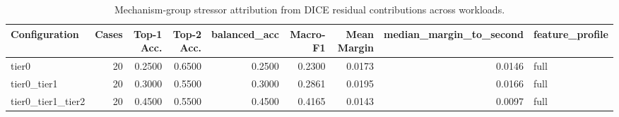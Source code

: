 \begin{table}[t]
\centering
\caption{Mechanism-group stressor attribution from DICE residual contributions across workloads.}
\label{tab:dice_stressor_diagnosis}
\footnotesize
\begin{tabular}{lrrrrrrrl}
\toprule
Configuration & Cases & Top-1 Acc. & Top-2 Acc. & balanced_acc & Macro-F1 & Mean Margin & median_margin_to_second & feature_profile \\
\midrule
tier0 & 20 & 0.2500 & 0.6500 & 0.2500 & 0.2300 & 0.0173 & 0.0146 & full \\
tier0_tier1 & 20 & 0.3000 & 0.5500 & 0.3000 & 0.2861 & 0.0195 & 0.0166 & full \\
tier0_tier1_tier2 & 20 & 0.4500 & 0.5500 & 0.4500 & 0.4165 & 0.0143 & 0.0097 & full \\
\bottomrule
\end{tabular}

\end{table}
